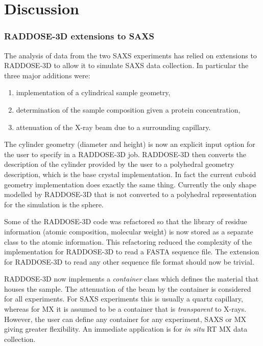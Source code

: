 \section{Discussion}
\label{sec:Discussion - SAXS}

\subsubsection{RADDOSE-3D extensions to SAXS}
\label{subs:RADDOSE-3D extensions to SAXS}

The analysis of data from the two SAXS experiments has relied on extensions to RADDOSE-3D to allow it to simulate SAXS data collection.
In particular the three major additions were:
\begin{enumerate}
    \item implementation of a cylindrical sample geometry,
    \item determination of the sample composition given a protein concentration,
    \item attenuation of the X-ray beam due to a surrounding capillary.
\end{enumerate}
The cylinder geometry (diameter and height) is now an explicit input option for the user to specify in a RADDOSE-3D job.
RADDOSE-3D then converts the description of the cylinder provided by the user to a polyhedral geometry description, which is the base crystal implementation.
In fact the current cuboid geometry implementation does exactly the same thing.
Currently the only shape modelled by RADDOSE-3D that is not converted to a polyhedral representation for the simulation is the sphere.

Some of the RADDOSE-3D code was refactored so that the library of residue information (atomic composition, molecular weight) is now stored as a separate class to the atomic information. This refactoring reduced the complexity of the implementation for RADDOSE-3D to read a FASTA sequence file. The extension for RADDOSE-3D to read any other sequence file format should now be trivial.

RADDOSE-3D now implements a \textit{container} class which defines the material that houses the sample.
The attenuation of the beam by the container is considered for all experiments.
For SAXS experiments this is usually a quartz capillary, whereas for MX it is assumed to be a container that is \textit{transparent} to X-rays.
However, the user can define any container for any experiment, SAXS or MX giving greater flexibility.
An immediate application is for \textit{in situ} RT MX data collection.

